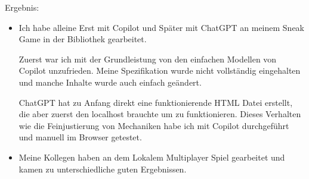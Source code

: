 \documentclass[a4paper]{article}
\begin{document}
Ergebnis:

\begin{itemize}
    \item Ich habe alleine Erst mit Copilot und Später mit ChatGPT an meinem Sneak Game in der Bibliothek gearbeitet.
    
    Zuerst war ich mit der Grundleistung von den einfachen Modellen von Copilot unzufrieden. Meine Spezifikation wurde nicht vollständig eingehalten und manche Inhalte wurde auch einfach geändert.

    ChatGPT hat zu Anfang direkt eine funktionierende HTML Datei erstellt, die aber zuerst den localhost brauchte um zu funktionieren. Dieses Verhalten wie die Feinjustierung von Mechaniken habe ich mit Copilot durchgeführt und manuell im Browser getestet. 

    \item Meine Kollegen haben an dem Lokalem Multiplayer Spiel gearbeitet und kamen zu unterschiedliche guten Ergebnissen.
\end{itemize}
\end{document}
